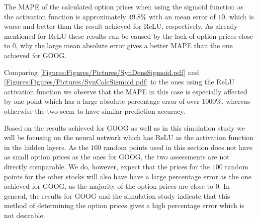 
The MAPE of the calculated option prices when using the sigmoid function as the activation function is approximately $49.8\%$ with an mean error of $10$, which is worse and better than the result achieved for ReLU, respectively. As already mentioned for ReLU these results can be caused by the lack of option prices close to $0$, why the large mean absolute error gives a better MAPE than the one achieved for GOOG.

Comparing \autoref{Figures:Figures/Pictures/SynDensSigmoid.pdf} and \autoref{Figures:Figures/Pictures/SynCalcSigmoid.pdf} to the ones using the ReLU activation function we observe that the MAPE in this case is especially affected by one point which has a large absolute percentage error of over $1000\%$, whereas otherwise the two seem to have similar prediction accuracy. 

Based on the results achieved for GOOG as well as in this simulation study we will be focusing on the neural network which has ReLU as the activation function in the hidden layers. As the $100$ random points used in this section does not have as small option prices as the ones for GOOG, the two assessments are not directly comparable. We do, however, expect that the prices for the $100$ random points for the other stocks will also have have a large percentage error as the one achieved for GOOG, as the majority of the option prices are close to $0$. In general, the results for GOOG and the simulation study indicate that this method of determining the option prices gives a high percentage error which is not desirable. 